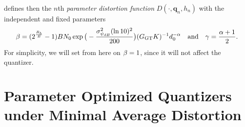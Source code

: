 \documentclass[smallabstract,smallcaptions]{dccpaper}
\renewcommand{\vp}{\mathbf q}
\newcommand{\Rb}{\ensuremath{R_b}}         %
\newcommand{\GGT}{\ensuremath{G_{\text{GT}}}}         %
\begin{document}
%
defines then the $n$th \emph{parameter distortion function} $D(\cdot,\vp_n,h_n)$  with the independent and fixed parameters
%
\begin{align}
  \bet=(2^{\frac{\Rb}{B}}-1)B N_0 \exp\big(-\frac{\sig_{\psi_{dB}}^2 (\ln 10)^2}{200}\big)(\GGT K)^{-1}
  d_0^{-\alp}\quad\text{and}\quad
  \gam=\frac{\alp+1}{2}.
\end{align}
%
For simplicity, we will set from here on $\beta=1$, since it will not affect the quantizer. 


\section{Parameter Optimized Quantizers under Minimal Average Distortion}
\end{document}
